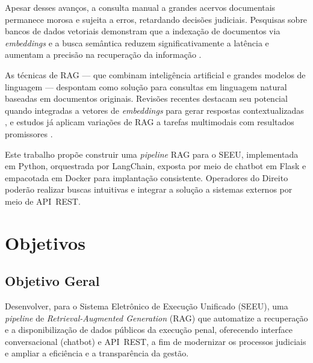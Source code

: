 Apesar desses avanços, a consulta manual a grandes acervos documentais permanece morosa e sujeita a erros, retardando decisões judiciais. Pesquisas sobre bancos de dados vetoriais demonstram que a indexação de documentos via \textit{embeddings} e a busca semântica reduzem significativamente a latência e aumentam a precisão na recuperação da informação \cite{taipalus2024vector,gao2023survey}.

As técnicas de RAG — que combinam inteligência artificial e grandes modelos de linguagem — despontam como solução para consultas em linguagem natural baseadas em documentos originais. Revisões recentes destacam seu potencial quando integradas a vetores de \textit{embeddings} para gerar respostas contextualizadas \cite{qwak2024integrating}, e estudos já aplicam variações de RAG a tarefas multimodais com resultados promissores \cite{pujiono2024implementing}.

Este trabalho propõe construir uma \textit{pipeline} RAG para o SEEU, implementada em Python, orquestrada por LangChain, exposta por meio de chatbot em Flask e empacotada em Docker para implantação consistente. Operadores do Direito poderão realizar buscas intuitivas e integrar a solução a sistemas externos por meio de API~REST.





\section{Objetivos}
\label{sec:objetivos}

\subsection{Objetivo Geral}
Desenvolver, para o Sistema Eletrônico de Execução Unificado (SEEU), uma \textit{pipeline} de \textit{Retrieval-Augmented Generation} (RAG) que automatize a recuperação e a disponibilização de dados públicos da execução penal, oferecendo interface conversacional (chatbot) e API~REST, a fim de modernizar os processos judiciais e ampliar a eficiência e a transparência da gestão.

